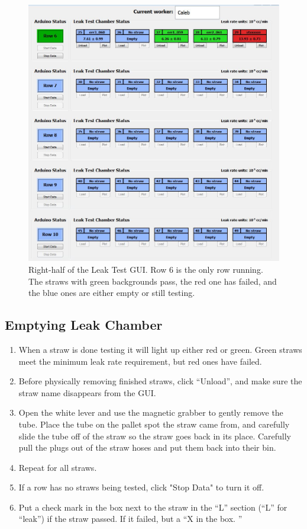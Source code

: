 \documentclass[letterpaper,12pt]{article}
\begin{document}
\begin{figure}[ht]
	\center
	\includegraphics[scale=0.5]{GUI}
	\caption{Right-half of the Leak Test GUI.  Row 6 is the only row running.  The straws with green backgrounds pass, the red one has failed, and the blue ones are either empty or still testing.} \label{GUI}
\end{figure}






\subsection{Emptying Leak Chamber}
	\begin{enumerate}
		\item When a straw is done testing it will light up either red or green.  Green straws meet the minimum leak rate requirement, but red ones have failed.  
	\item Before physically removing finished straws, click ``Unload'', and make sure the straw name disappears from the GUI.  
	\item Open the white lever and use the magnetic grabber to gently remove the tube. Place the tube on the pallet spot the straw came from, and carefully slide the tube off of the straw so the straw goes back in its place. Carefully pull the plugs out of the straw hoses and put them back into their bin.
	\item Repeat for all straws.
	\item If a row has no straws being tested, click "Stop Data" to turn it off.
	\item Put a check mark in the box next to the straw in the ``L'' section (``L'' for ``leak'') if the straw passed. If it failed, but a ``X in the box.
	''
\end{enumerate}
\end{document}
